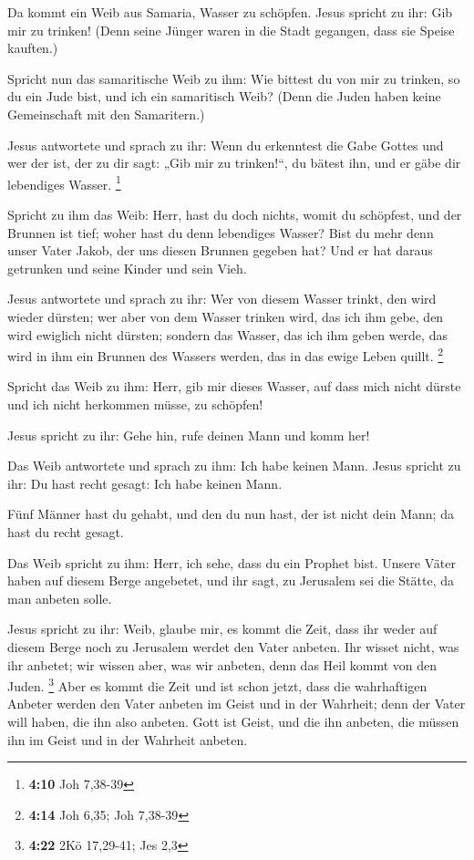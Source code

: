  Da kommt ein Weib aus Samaria, Wasser zu schöpfen. Jesus
spricht zu ihr: Gib mir zu trinken!  (Denn seine Jünger
waren in die Stadt gegangen, dass sie Speise kauften.)

 Spricht nun das samaritische Weib zu ihm: Wie bittest du
von mir zu trinken, so du ein Jude bist, und ich ein samaritisch Weib?
(Denn die Juden haben keine Gemeinschaft mit den Samaritern.)

 Jesus antwortete und sprach zu ihr: Wenn du erkenntest
die Gabe Gottes und wer der ist, der zu dir sagt: „Gib mir zu
trinken!{}``, du bätest ihn, und er gäbe dir lebendiges Wasser.
\footnote{\textbf{4:10} Joh 7,38-39}

 Spricht zu ihm das Weib: Herr, hast du doch nichts,
womit du schöpfest, und der Brunnen ist tief; woher hast du denn
lebendiges Wasser?  Bist du mehr denn unser Vater Jakob,
der uns diesen Brunnen gegeben hat? Und er hat daraus getrunken und
seine Kinder und sein Vieh.

 Jesus antwortete und sprach zu ihr: Wer von diesem
Wasser trinkt, den wird wieder dürsten;  wer aber von dem
Wasser trinken wird, das ich ihm gebe, den wird ewiglich nicht dürsten;
sondern das Wasser, das ich ihm geben werde, das wird in ihm ein Brunnen
des Wassers werden, das in das ewige Leben quillt. \footnote{\textbf{4:14}
  Joh 6,35; Joh 7,38-39}

 Spricht das Weib zu ihm: Herr, gib mir dieses Wasser,
auf dass mich nicht dürste und ich nicht herkommen müsse, zu schöpfen!

 Jesus spricht zu ihr: Gehe hin, rufe deinen Mann und
komm her!

 Das Weib antwortete und sprach zu ihm: Ich habe keinen
Mann. Jesus spricht zu ihr: Du hast recht gesagt: Ich habe keinen Mann.

 Fünf Männer hast du gehabt, und den du nun hast, der ist
nicht dein Mann; da hast du recht gesagt.

 Das Weib spricht zu ihm: Herr, ich sehe, dass du ein
Prophet bist.  Unsere Väter haben auf diesem Berge
angebetet, und ihr sagt, zu Jerusalem sei die Stätte, da man anbeten
solle.

 Jesus spricht zu ihr: Weib, glaube mir, es kommt die
Zeit, dass ihr weder auf diesem Berge noch zu Jerusalem werdet den Vater
anbeten.  Ihr wisset nicht, was ihr anbetet; wir wissen
aber, was wir anbeten, denn das Heil kommt von den Juden. \footnote{\textbf{4:22}
  2Kö 17,29-41; Jes 2,3}  Aber es kommt die Zeit und ist
schon jetzt, dass die wahrhaftigen Anbeter werden den Vater anbeten im
Geist und in der Wahrheit; denn der Vater will haben, die ihn also
anbeten.  Gott ist Geist, und die ihn anbeten, die müssen
ihn im Geist und in der Wahrheit anbeten.

